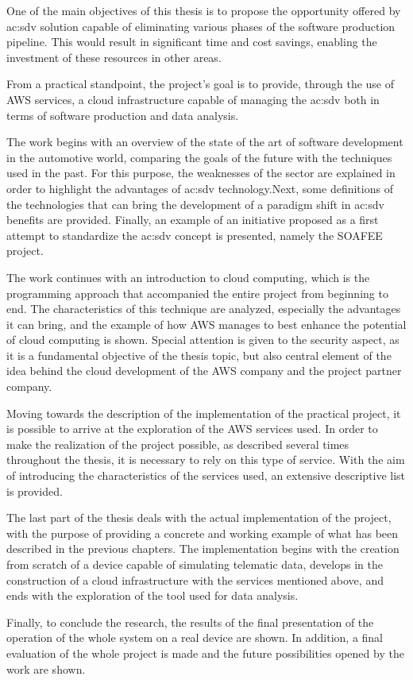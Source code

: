 One of the main objectives of this thesis is to propose the opportunity offered by \gls{ac:sdv} solution capable of eliminating various phases of the software production pipeline. This would result in significant time and cost savings, enabling the investment of these resources in other areas.

From a practical standpoint, the project's goal is to provide, through the use of AWS services, a cloud infrastructure capable of managing the \gls{ac:sdv} both in terms of software production and data analysis.

The work begins with an overview of the state of the art of software development in the automotive world, comparing the goals of the future with the techniques used in the past. For this purpose, the weaknesses of the sector are explained in order to highlight the advantages of \gls{ac:sdv} technology.Next, some definitions of the technologies that can bring the development of a paradigm shift in \gls{ac:sdv} benefits are provided. Finally, an example of an initiative proposed as a first attempt to standardize the \gls{ac:sdv} concept is presented, namely the SOAFEE project.

The work continues with an introduction to cloud computing, which is the programming approach that accompanied the entire project from beginning to end. The characteristics of this technique are analyzed, especially the advantages it can bring, and the example of how AWS manages to best enhance the potential of cloud computing is shown. Special attention is given to the security aspect, as it is a fundamental objective of the thesis topic, but also central element of the idea behind the cloud development of the AWS company and the project partner company.

Moving towards the description of the implementation of the practical project, it is possible to arrive at the exploration of the AWS services used. In order to make the realization of the project possible, as described several times throughout the thesis, it is necessary to rely on this type of service. With the aim of introducing the characteristics of the services used, an extensive descriptive list is provided.

The last part of the thesis deals with the actual implementation of the project, with the purpose of providing a concrete and working example of what has been described in the previous chapters. The implementation begins with the creation from scratch of a device capable of simulating telematic data, develops in the construction of a cloud infrastructure with the services mentioned above, and ends with the exploration of the tool used for data analysis.

Finally, to conclude the research, the results of the final presentation of the operation of the whole system on a real device are shown. In addition, a final evaluation of the whole project is made and the future possibilities opened by the work are shown.